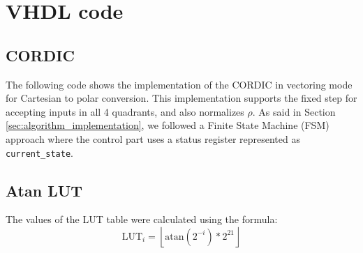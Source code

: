 \chapter{VHDL code}


\section{CORDIC}
The following code shows the implementation of the CORDIC in vectoring mode for Cartesian to polar conversion. This implementation supports the fixed step for accepting inputs in all 4 quadrants, and also normalizes $\rho$. As said in Section \ref{sec:algorithm_implementation}, we followed a Finite State Machine (FSM) approach where the control part uses a status register represented as \texttt{current\_state}.

\begin{code}
    \label{code:vhdl}
\end{code}


\section{Atan LUT}
The values of the LUT table were calculated using the formula:
\[
    \text{LUT}_i = \left\lfloor \text{atan}(2^{-i} )* 2^{21} \right\rfloor
\]
\begin{code}
    \label{code:lut}
\end{code}
